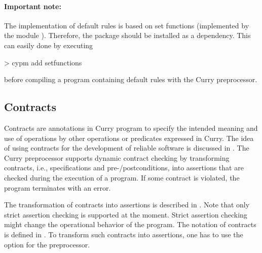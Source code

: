 \paragraph{Important note:}
The implementation of default rules is based on set functions
(implemented by the module ).
Therefore, the package  should be installed
as a dependency.
This can easily done by executing
%
\begin{curry}
> cypm add setfunctions
\end{curry}
%
before compiling a program containing default rules with the
Curry preprocessor.


\subsection{Contracts}

Contracts are annotations in Curry program to specify the
intended meaning and use of operations by other operations
or predicates expressed in Curry.
The idea of using contracts for the development
of reliable software is discussed in \cite{AntoyHanus12PADL}.
The Curry preprocessor supports dynamic contract checking
by transforming contracts, i.e., specifications and
pre-/postconditions, into assertions that are checked
during the execution of a program.
If some contract is violated, the program terminates
with an error.

The transformation of contracts into assertions is described
in \cite{AntoyHanus12PADL}.
Note that only strict assertion checking is supported
at the moment.
Strict assertion checking might change the operational behavior
of the program.
The notation of contracts is defined in \cite{AntoyHanus12PADL}.
To transform such contracts into assertions,
one has to use the option  for the preprocessor.

